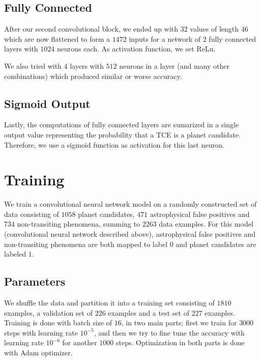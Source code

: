 \documentclass[twoside]{article}
\begin{document}
\begin{multicols}{2}
\subsection{Fully Connected}
After our second convolutional block, we ended up with $32$ values of length $46$ which are now flattened to form a $1472$ inputs for a network of $2$ fully connected layers with $1024$ neurons each. As activation function, we set ReLu.

We also tried with $4$ layers with $512$ neurons in a layer (and many other combinations) which produced similar or worse accuracy.

\subsection{Sigmoid Output}
Lastly, the computations of fully connected layers are sumarized in a single output value representing the probability that a TCE is a planet candidate. Therefore, we use a sigmoid function as activation for this last neuron.


\section{Training}
We train a convolutional neural network model on a randomly constructed set of data consisting of $1058$ planet candidates, $471$ astrophysical false positives and $734$ non-transiting phenomena, summing to $2263$ data examples. For this model (convolutional neural network described above), astrophysical false positives and non-transiting phenomena are both mapped to label $0$ and planet candidates are labeled $1$. 

\subsection{Parameters}
We shuffle the data and partition it into a training set consisting of $1810$ examples, a validation set of $226$ examples and a test set of $227$ examples. Training is done with batch size of $16$, in two main parts; first we train for $3000$ steps with learning rate $10^{-5}$, and then we try to fine tune the accuracy with learning rate $10^{-6}$ for another $1000$ steps. Optimization in both parts is done with Adam optimizer.


\end{multicols}
\end{document}
